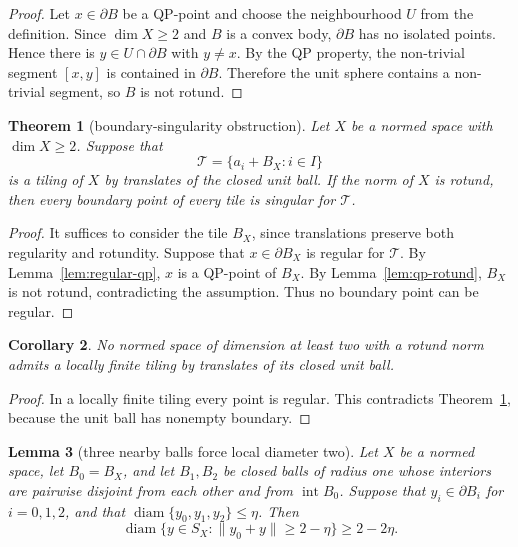 \documentclass[11pt]{amsart}
\newtheorem{theorem}{Theorem}
\newtheorem{lemma}[theorem]{Lemma}
\newtheorem{corollary}[theorem]{Corollary}
\theoremstyle{definition}
\theoremstyle{remark}
\newcommand{\T}{\mathcal T}
\newcommand{\B}{B_X}
\newcommand{\intt}{\operatorname{int}}
\newcommand{\diam}{\operatorname{diam}}
\begin{document}
\begin{proof}
Let \(x\in\partial B\) be a QP-point and choose the neighbourhood \(U\) from
the definition. Since \(\dim X\geq2\) and \(B\) is a convex body, \(\partial B\)
has no isolated points. Hence there is \(y\in U\cap\partial B\) with
\(y\neq x\). By the QP property, the non-trivial segment \([x,y]\) is contained
in \(\partial B\). Therefore the unit sphere contains a non-trivial segment,
so \(B\) is not rotund.
\end{proof}

\begin{theorem}[boundary-singularity obstruction]\label{thm:main}
Let \(X\) be a normed space with \(\dim X\geq2\). Suppose that
\[
  \T=\{a_i+\B:i\in I\}
\]
is a tiling of \(X\) by translates of the closed unit ball. If the norm of
\(X\) is rotund, then every boundary point of every tile is singular for
\(\T\).
\end{theorem}

\begin{proof}
It suffices to consider the tile \(\B\), since translations preserve both
regularity and rotundity. Suppose that \(x\in\partial\B\) is regular for
\(\T\). By Lemma~\ref{lem:regular-qp}, \(x\) is a QP-point of \(\B\). By
Lemma~\ref{lem:qp-rotund}, \(\B\) is not rotund, contradicting the assumption.
Thus no boundary point can be regular.
\end{proof}

\begin{corollary}
No normed space of dimension at least two with a rotund norm admits a locally
finite tiling by translates of its closed unit ball.
\end{corollary}

\begin{proof}
In a locally finite tiling every point is regular. This contradicts
Theorem~\ref{thm:main}, because the unit ball has nonempty boundary.
\end{proof}

\begin{lemma}[three nearby balls force local diameter two]\label{lem:three-balls}
Let \(X\) be a normed space, let \(B_0=B_X\), and let \(B_1,B_2\) be closed
balls of radius one whose interiors are pairwise disjoint from each other and
from \(\intt B_0\). Suppose that \(y_i\in\partial B_i\) for \(i=0,1,2\), and
that \(\diam\{y_0,y_1,y_2\}\leq \eta\). Then
\[
  \diam\{y\in S_X:\|y_0+y\|\geq 2-\eta\}\geq 2-2\eta .
\]
\end{lemma}
\end{document}
